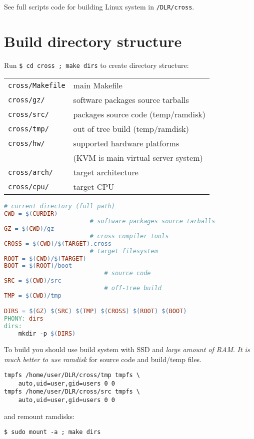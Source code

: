 \clearpage
{}%

\bigskip
See full scripts code for building Linux system in \verb|/DLR/cross|.

\clearpage
\section{Build directory structure}

Run \verb|$ cd cross ; make dirs| to create directory structure:

\bigskip
\begin{tabular}{l l}
\verb|cross/Makefile| & main Makefile \\
\verb|cross/gz/| & software packages source tarballs \\
\verb|cross/src/| & packages source code (temp/ramdisk)\\
\verb|cross/tmp/| & out of tree build (temp/ramdisk)\\
\verb|cross/hw/| & supported hardware platforms\\
				&(KVM is main virtual server system)\\
\verb|cross/arch/| & target architecture\\
\verb|cross/cpu/| & target CPU\\
\end{tabular}

\clearpage
{}%
\clearpage

\begin{lstlisting}[language=make]
						# current directory (full path)
CWD = $(CURDIR)
						# software packages source tarballs
GZ = $(CWD)/gz
						# cross compiler tools						
CROSS = $(CWD)/$(TARGET).cross
						# target filesystem
ROOT = $(CWD)/$(TARGET)
BOOT = $(ROOT)/boot
							# source code
SRC = $(CWD)/src
							# off-tree build
TMP = $(CWD)/tmp

DIRS = $(GZ) $(SRC) $(TMP) $(CROSS) $(ROOT) $(BOOT)
PHONY: dirs
dirs:
	mkdir -p $(DIRS)
\end{lstlisting}

To build you should use build system with SSD and \emph{large amount of RAM}.
\emph{It is much better to use ramdisk} for source code and build/temp files.

\begin{lstlisting}[title=add this to /etc/fstab (change to your home/gid/uid)]
tmpfs /home/user/DLR/cross/tmp tmpfs \
	auto,uid=user,gid=users 0 0
tmpfs /home/user/DLR/cross/src tmpfs \
	auto,uid=user,gid=users 0 0
\end{lstlisting}
and remount ramdisks:
\begin{lstlisting}
$ sudo mount -a ; make dirs
\end{lstlisting}

